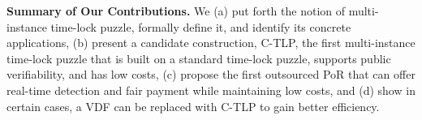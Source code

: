 \noindent\textbf{Summary of Our Contributions.} We (a) put forth the notion of multi-instance  time-lock puzzle,  formally define it, and identify its concrete applications,
(b) present a candidate construction, C-TLP,  the first multi-instance time-lock puzzle that is  built on a standard time-lock puzzle,  supports public verifiability, and  has low costs,   (c)  propose   the first  outsourced PoR that can offer  real-time detection and  fair payment while maintaining low costs, and (d) show in certain cases, a VDF can be replaced with C-TLP to gain better efficiency.



\vspace{-3mm}


